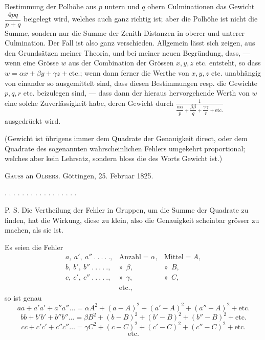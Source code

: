 Bestimmung der Polhöhe aus $p$ untern und $q$ obern Culminationen das
Gewicht $\dfrac{4pq}{p+q}$ beigelegt wird, welches auch ganz richtig ist;
aber die Polhöhe ist nicht die Summe, sondern nur die  Summe der
Zenith-Distanzen in oberer und unterer Culmination. Der Fall ist also ganz
verschieden. Allgemein lässt sich zeigen,  aus den
Grundsätzen meiner Theoria, und  bei meiner neuen
Begründung, dass, --- wenn eine Grösse $w$ aus der Combination der Grössen
$x,y,z$ etc. entsteht, so dass $w=\alpha x+\beta y+\gamma z+\text{etc.}$;
wenn dann ferner die Werthe von $x,y,z$ etc. unabhängig von einander so
ausgemittelt sind, dass diesen Bestimmungen resp. die Gewichte $p,q,r$ etc.
beizulegen sind, --- dass dann der hieraus hervorgehende Werth von $w$
eine solche Zuverlässigkeit habe, deren Gewicht durch $\frac{1}{\dfrac{\alpha\alpha}{p}+\dfrac{\beta\beta}{q}+\dfrac{\gamma\gamma}{r}+\text{etc.}} $ ausgedrückt wird.

(Gewicht ist übrigens immer dem Quadrate der Genauigkeit
direct, oder dem Quadrate des sogenannten wahrscheinlichen Fehlers
umgekehrt proportional; welches aber kein Lehrsatz, sondern bloss die
 des Worts Gewicht ist.)



\begin{center}
\textsc{Gauss} an \textsc{Olbers}. Göttingen, 25. Februar 1825.
\end{center}

\begin{center}
. . . . . . . . . . . . . . . . .
\end{center}

P. S. Die Vertheilung der Fehler in Gruppen, um die Summe der Quadrate zu
finden, hat  die Wirkung, diese zu klein, also die Genauigkeit
scheinbar grösser zu machen, als sie ist.

Es seien die Fehler
\[
\begin{array}{lll}
a,\ a',\ a''\ .\ .\ .\ .\ ., & \text{Anzahl}=\alpha, & \text{Mittel}=A, \\
b,\ b',\ b''\ .\ .\ .\ .\ ., & \text{»}\ \ \beta, & \text{»}\ \ B, \\
c,\ c',\ c''\ .\ .\ .\ .\ ., & \text{»}\ \ \gamma, & \text{»}\ \ C, \\
& \text{etc.,} &
\end{array}
\]
so ist genau
\[
aa+a'a'+a''a''\ldots=\alpha A^2+(a-A)^2+(a'-A)^2+(a''-A)^2+\text{etc.}
\]
\[
bb+b'b'+b''b''\ldots=\beta B^2+(b-B)^2+(b'-B)^2+(b''-B)^2+\text{etc.}
\]
\[
cc+c'c'+c''c''\ldots=\gamma C^2+(c-C)^2+(c'-C)^2+(c''-C)^2+\text{etc.}
\]
\[
\text{etc.}
\]

